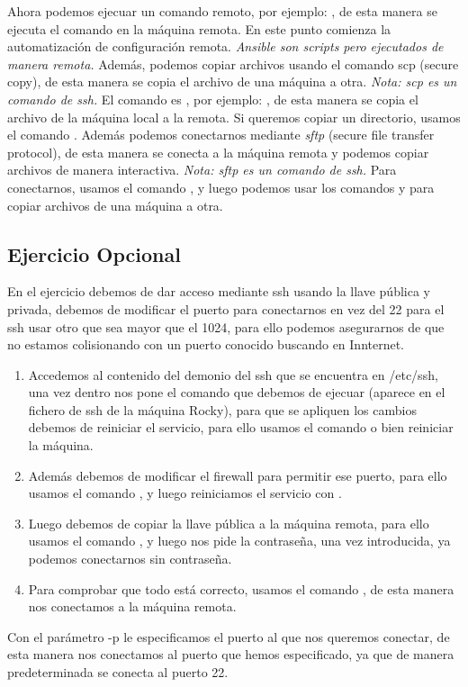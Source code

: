 Ahora podemos ejecuar un comando remoto, por ejemplo: , de esta manera se ejecuta el comando en la máquina remota. En este punto comienza la automatización de configuración remota. \textit{Ansible son scripts pero ejecutados de manera remota.} Además, podemos copiar archivos usando el comando scp (secure copy), de esta manera se copia el archivo de una máquina a otra. \textit{Nota: scp es un comando de ssh.} El comando es , por ejemplo: , de esta manera se copia el archivo de la máquina local a la remota. Si queremos copiar un directorio, usamos el comando . Además podemos conectarnos mediante \textit{sftp} (secure file transfer protocol), de esta manera se conecta a la máquina remota y podemos copiar archivos de manera interactiva. \textit{Nota: sftp es un comando de ssh.} Para conectarnos, usamos el comando , y luego podemos usar los comandos  y  para copiar archivos de una máquina a otra.

\subsection{Ejercicio Opcional}

En el ejercicio debemos de dar acceso mediante ssh usando la llave pública y privada, debemos de modificar el puerto para conectarnos en vez del 22 para el ssh usar otro que sea mayor que el 1024, para ello podemos asegurarnos de que no estamos colisionando con un puerto conocido buscando en Innternet.

\begin{enumerate}
    \item Accedemos al contenido del demonio del ssh que se encuentra en /etc/ssh, una vez dentro nos pone el comando que debemos de ejecuar  (aparece en el fichero de ssh de la máquina Rocky), para que se apliquen los cambios debemos de reiniciar el servicio, para ello usamos el comando  o bien reiniciar la máquina.
    \item Además debemos de modificar el firewall para permitir ese puerto, para ello usamos el comando , y luego reiniciamos el servicio con .
    \item Luego debemos de copiar la llave pública a la máquina remota, para ello usamos el comando , y luego nos pide la contraseña, una vez introducida, ya podemos conectarnos sin contraseña.
    \item Para comprobar que todo está correcto, usamos el comando , de esta manera nos conectamos a la máquina remota.
\end{enumerate}

Con el parámetro -p le especificamos el puerto al que nos queremos conectar, de esta manera nos conectamos al puerto que hemos especificado, ya que de manera predeterminada se conecta al puerto 22.